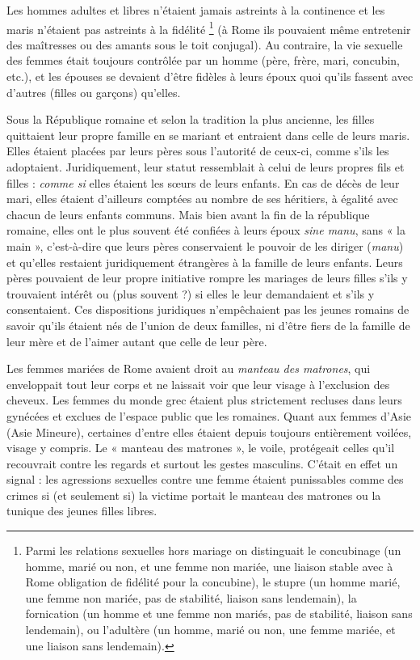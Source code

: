 Les hommes adultes et libres n'étaient jamais astreints à la continence
et les maris n'étaient pas astreints à la fidélité%
\footnote{Parmi les relations sexuelles hors mariage on distinguait le concubinage (un homme, marié ou non, et une
femme non mariée, une liaison stable avec à Rome obligation de fidélité pour la concubine), le stupre (un homme 
marié, une femme non mariée, pas de stabilité, liaison sans lendemain), la fornication (un homme et une femme 
non mariés, pas de stabilité, liaison sans lendemain), ou l'adultère (un homme, marié ou non, une femme mariée, 
et une liaison sans lendemain).}
(à Rome ils pouvaient
même entretenir des maîtresses ou des amants sous le toit conjugal).
Au contraire, la vie sexuelle des femmes était toujours contrôlée par
un homme (père, frère, mari, concubin, etc.), et les épouses se devaient
d'être fidèles à leurs époux quoi qu'ils fassent avec d'autres (filles ou garçons)
qu'elles.

Sous la République romaine et selon la tradition la plus ancienne,
les filles quittaient leur propre famille en se mariant et entraient dans celle
de leurs maris. Elles étaient placées par leurs pères sous l'autorité de
ceux-ci, comme s'ils les adoptaient. Juridiquement, leur statut ressemblait
à celui de leurs propres fils et filles : \emph{comme si} elles étaient les sœurs de
leurs enfants. En cas de décès de leur mari, elles étaient d'ailleurs comptées
au nombre de ses héritiers, à égalité avec chacun de leurs enfants
communs. Mais bien avant la fin de la république romaine, elles ont le
plus souvent été confiées à leurs époux \emph{sine manu}, sans « la main », c'est-à-dire
que leurs pères conservaient le pouvoir de les diriger (\emph{manu}) et
qu'elles restaient juridiquement étrangères à la famille de leurs enfants.
Leurs pères pouvaient de leur propre initiative rompre les mariages de
leurs filles s'ils y trouvaient intérêt ou (plus souvent ?) si elles le leur demandaient
et s'ils y consentaient. Ces dispositions juridiques n'empêchaient
pas les jeunes romains de savoir qu'ils étaient nés de l'union de
deux familles, ni d'être fiers de la famille de leur mère et de l'aimer autant
que celle de leur père.

Les femmes mariées de Rome avaient droit au \emph{manteau des matrones},
qui enveloppait tout leur corps et ne laissait voir que leur visage à l'exclusion
des cheveux. Les femmes du monde grec étaient plus strictement
recluses dans leurs gynécées et exclues de l'espace public que les romaines.
Quant aux femmes d'Asie (Asie Mineure), certaines d'entre elles
étaient depuis toujours entièrement voilées, visage y compris. Le
« manteau des matrones », le voile, protégeait celles qu'il recouvrait
contre les regards et surtout les gestes masculins. C'était en effet un signal :
les agressions sexuelles contre une femme étaient punissables
comme des crimes si (et seulement si) la victime portait le manteau des
matrones ou la tunique des jeunes filles libres.

